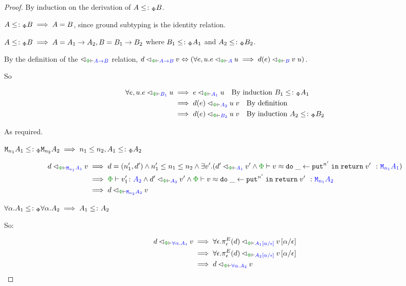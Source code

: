 \documentclass{Report}
\newcommand\eLogRel[4]{\logRel{#2}{\wellformed{#1}{#3}}{#4}}
\newcommand\peLogRel[3]{\eLogRel{\P}{#1}{#2}{#3}}
\newcommand{\zptyperelation}[2]{\typerelation{\P}{#1}{#2}}
\newcommand{\zpberelation}[2]{\berelation{\P}{#1}{#2}}
\newcommand{\fapply}[0]{^E}
\newcommand{\pe}[0]{\pi_\e}
\begin{document}
\begin{proof}
    By induction on the derivation of $A\leq\colon_\Phi B$.

        $A\leq\colon_\Phi B\implies A = B$, since ground subtyping is the identity relation.

        $A\leq\colon_\Phi B\implies A = A_1\rightarrow A_2, B = B_1\rightarrow B_2$ where $B_1\leq\colon_\Phi A_1$ and $A_2\leq\colon_\Phi B_2$.

        By the definition of the $\relates_{\wellformed{\P}{\ab}}$ relation, $\peLogRel{d}{\ab}{v} \Leftrightarrow (\forall e, u. \peLogRel{e}{A}{u}\implies \peLogRel{d(e)}{B}{\apply{v}{u}})$.

        So 

        \begin{align*}
            \forall e, u. \peLogRel{e}{B_1}{u} & \implies \peLogRel{e}{A_1}{u} \qt{By induction $B_1\subtypep A_1$}\\
            & \implies \peLogRel{d(e)}{A_2}{\apply{u}{v}}\qt{By definition}\\
            & \implies \peLogRel{d(e)}{B_2}{\apply{u}{v}}\qt{By induction $A_2\subtypep B_2$}
        \end{align*}

        As required.

    $\texttt{M}_{n_1}{A_1} \leq\colon_\Phi \texttt{M}_{n_2}{A_2} \implies n_1\leq n_2, A_1\leq\colon_\Phi A_2$

    \begin{align*}
        \peLogRel{d}{\M{n_1}{A_1}}{v} & \implies  d=(n_1', d') \wedge n_1' \leq n_1\leq n_2 \wedge \exists v'. (\peLogRel{d'}{A_1}{v'} \wedge\zpberelation{v}{\doin{\_}{\put^{n'}}{\return{v'}}}{\M{n_1}{A_1}})\\
        & \implies \zptyperelation{v_1'}{A_2} \wedge \peLogRel{d'}{A_2}{v'} \wedge \zpberelation{v}{\doin{\_}{\put^{n'}}{\return{v'}}}{\M{n_1}{A_2}}\\
        & \implies \peLogRel{d}{\M{n_2}{A_2}}{v}
    \end{align*}

    $\forall \alpha. A_1\leq\colon_\Phi \forall \alpha. A_2\implies A_1\leq\colon A_2$

    So:

    \begin{align*}
        \peLogRel{d}{\all{\a}{A_1}}{v} & \implies \peLogRel{\all{\e}{\pe\fapply(d)}}{A_1\ssub{\e}{\a}}{v\ssub{\e}{\a}}\\
        & \implies \peLogRel{\all{\e}{\pe\fapply(d)}}{A_2\ssub{\e}{\a}}{v\ssub{\e}{\a}}\\
        & \implies \peLogRel{d}{\all{\a}{A_2}}{v}
    \end{align*}
\end{proof}
\end{document}
